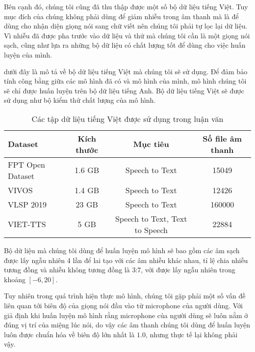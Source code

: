 	Bên cạnh đó, chúng tôi cũng đã thu thập được một số bộ dữ liệu tiếng Việt. Tuy mục đích của chúng không phải dùng để giảm nhiễu trong âm thanh mà là để dùng cho nhận diện giọng nói sang chữ viết nên chúng tôi phải tự lọc lại dữ liệu. Vì nhiễu đã được pha trước vào dữ liệu và thứ mà chúng tôi cần là một giọng nói sạch, cũng như lựa ra những bộ dữ liệu có chất lượng tốt để dùng cho việc huấn luyện của mình. 
	
	 dưới đây là mô tả về bộ dữ liệu tiếng Việt mà chúng tôi sẽ sử dụng. Để đảm bảo tính công bằng giữa các mô hình đã có và mô hình của mình, mô hình chúng tôi sẽ chỉ được huấn luyện trên bộ dữ liệu tiếng Anh. Bộ dữ liệu tiếng Việt sẽ được sử dụng như bộ kiểm thử chất lượng của mô hình.
	
		\begin{table}[h]
			\centering
			\begin{tabular}{l c c c}
				\hline
				\textbf{Dataset} 		& \textbf{Kích thước}	& \textbf{Mục tiêu}	& \textbf{Số file âm thanh} \\
				\hline
				FPT Open Dataset		& 1.6 GB				& 	Speech to Text 	& 15049 \\
				VIVOS \cite{vivos}		& 1.4 GB				& 	Speech to Text 	& 12426 \\
				VLSP 2019				& 23 GB					& 	Speech to Text 	& 160000 \\
				VIET-TTS				& 5 GB					& 	Speech to Text, Text to Speech & 22884 \\
				\hline
			\end{tabular}
			\caption{Các tập dữ liệu tiếng Việt được sử dụng trong luận văn}
			\label{re::vie_datasets}
		\end{table}
	
	Bộ dữ liệu mà chúng tôi dùng để huấn luyện mô hình sẽ bao gồm các âm sạch được lấy ngẫu nhiên 4 lần để lai tạo với các âm nhiễu khác nhau, tỉ lệ chia nhiễu tương đồng và nhiễu không tương đồng là 3:7, với  được lấy ngẫu nhiên trong khoảng $[-6, 20]$.
	
	Tuy nhiên trong quá trình hiện thực mô hình, chúng tôi gặp phải một số vấn đề liên quan tới biên độ của giọng nói đầu vào từ microphone của người dùng. Với giả định khi huấn luyện mô hình rằng microphone của người dùng sẽ luôn nằm ở đúng vị trí của miệng lúc nói, do vậy các âm thanh chúng tôi dùng để huấn luyện luôn được chuẩn hóa về biên độ lớn nhất là $1.0$, nhưng thực tế lại không phải vậy.
	
